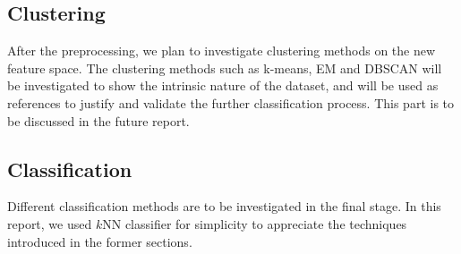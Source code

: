 \documentclass[12pt]{article}
\begin{document}
 
\subsection{Clustering}
After the preprocessing, we plan to investigate clustering methods on the new feature space. The clustering methods such as k-means, EM and DBSCAN will be investigated to show the intrinsic nature of the dataset, and will be used as references to justify and validate the further classification process. This part is to be discussed in the future report.

\subsection{Classification}
Different classification methods are to be investigated in the final stage. In this report, we used $k$NN classifier for simplicity to appreciate the techniques introduced in the former sections.
\end{document}
